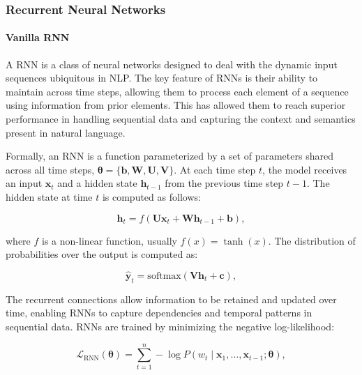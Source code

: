 

\subsubsection{Recurrent Neural Networks}

\paragraph{Vanilla \ac{RNN}} A \ac{RNN} is a class of neural networks designed to deal with the dynamic input sequences ubiquitous in \ac{NLP}. The key feature of \acp{RNN} is their ability to maintain  across time steps, allowing them to process each element of a sequence using information from prior elements. This has allowed them to reach superior performance in handling sequential data and capturing the context and semantics present in natural language.  

Formally, an \ac{RNN} is a function parameterized by a set of parameters shared across all time steps, $\bm{\theta} = \{\bm{b}, \bm{W}, \bm{U}, \bm{V}\}$. At each time step $t$, the model receives an input $\bm{x}_t$ and a hidden state $\bm{h}_{t-1}$ from the previous time step $t-1$. The hidden state at time $t$ is computed as follows:

\begin{equation}
    \bm{h}_{t} = f(\bm{U}\bm{x}_t + \bm{W}\bm{h}_{t-1} + \bm{b}),  
\end{equation}

where $f$ is a non-linear function, usually $f(x) = \tanh(x)$. The distribution of probabilities over the output is computed as:

\begin{equation}
    \hat{\bm{y}}_t = \mathrm{softmax}(\bm{V}\bm{h}_t + \bm{c}),
\label{eq-rnn}
\end{equation}

The recurrent connections allow information to be retained and updated over time, enabling \acp{RNN} to capture dependencies and temporal patterns in sequential data. \acp{RNN} are trained by minimizing the negative log-likelihood:

\begin{equation}
    \mathcal{L}_{\mathrm{RNN}}(\bm{\theta}) = \sum_{t=1}^{n} - \log P(w_t \mid \bm{x}_1, \ldots, \bm{x}_{t-1}; \bm{\theta}),
\end{equation}

